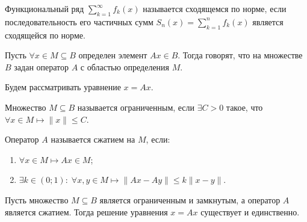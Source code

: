 	\begin{definition}
		Функциональный ряд $\sum\limits_{k = 1}^{\infty} f_k(x)$ называется сходящемся по норме, если последовательность его частичных сумм $S_n(x) = \sum\limits_{k = 1}^{n} f_k(x)$ является сходящейся по норме.
	\end{definition}

	\begin{definition}
		Пусть $\forall x \in M \subseteq B$ определен элемент $Ax \in B$. Тогда говорят, что на множестве $B$ задан оператор $A$ с областью определения $M$.
	\end{definition}

	Будем рассматривать уравнение $x = Ax$.
	
	\begin{definition}
		Множество $M \subseteq B$ называется ограниченным, если $\exists C > 0$ такое, что $\forall x \in M \longmapsto \|x\| \leqslant C$.
	\end{definition}

	\begin{definition}
		Оператор $A$ называется сжатием на $M$, если:
		\begin{enumerate}
			\item $\forall x \in M \longmapsto Ax \in M$;
			
			\item $\exists k \in (0; 1): \; \forall x, y \in M \longmapsto \|Ax - Ay\| \leqslant k\|x -y\|$.
		\end{enumerate}
	\end{definition}

	\begin{theorem}
		
		Пусть множество $M \subseteq B$ является ограниченным и замкнутым, а оператор $A$ является сжатием. Тогда решение уравнения $x = Ax$ существует и единственно.
	\end{theorem}


